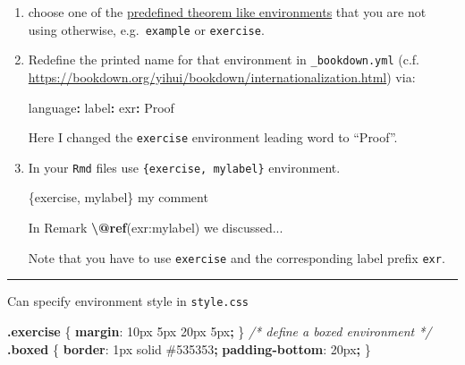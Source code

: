 \documentclass[
]{book}
\newenvironment{Shaded}{\begin{snugshade}}{\end{snugshade}}
\newcommand{\CharTok}[1]{\textcolor[rgb]{0.31,0.60,0.02}{#1}}
\newcommand{\CommentTok}[1]{\textcolor[rgb]{0.56,0.35,0.01}{\textit{#1}}}
\newcommand{\ConstantTok}[1]{\textcolor[rgb]{0.56,0.35,0.01}{#1}}
\newcommand{\DataTypeTok}[1]{\textcolor[rgb]{0.13,0.29,0.53}{#1}}
\newcommand{\DecValTok}[1]{\textcolor[rgb]{0.00,0.00,0.81}{#1}}
\newcommand{\FunctionTok}[1]{\textcolor[rgb]{0.13,0.29,0.53}{\textbf{#1}}}
\newcommand{\KeywordTok}[1]{\textcolor[rgb]{0.13,0.29,0.53}{\textbf{#1}}}
\newcommand{\NormalTok}[1]{#1}
\newcommand{\OperatorTok}[1]{\textcolor[rgb]{0.81,0.36,0.00}{\textbf{#1}}}
\newcommand{\SpecialCharTok}[1]{\textcolor[rgb]{0.81,0.36,0.00}{\textbf{#1}}}
\newcommand{\StringTok}[1]{\textcolor[rgb]{0.31,0.60,0.02}{#1}}
\theoremstyle{definition}
\theoremstyle{definition}
\theoremstyle{definition}
\theoremstyle{definition}
\theoremstyle{remark}
\begin{document}
\begin{enumerate}
\def\labelenumi{\arabic{enumi}.}
\item
  choose one of the \href{https://bookdown.org/yihui/bookdown/markdown-extensions-by-bookdown.html\#theorems}{predefined theorem like environments} that you are not using otherwise, e.g.~\texttt{example} or \texttt{exercise}.
\item
  Redefine the printed name for that environment in \texttt{\_bookdown.yml} (c.f. \url{https://bookdown.org/yihui/bookdown/internationalization.html}) via:

\begin{Shaded}
\begin{Highlighting}[]
\NormalTok{language}\SpecialCharTok{:}
\NormalTok{  label}\SpecialCharTok{:}
\NormalTok{    exr}\SpecialCharTok{:} \StringTok{\textquotesingle{}Proof \textquotesingle{}}
\end{Highlighting}
\end{Shaded}

  Here I changed the \texttt{exercise} environment leading word to ``Proof''.
\item
  In your \texttt{Rmd} files use \texttt{\{exercise,\ mylabel\}} environment.

\begin{Shaded}
\begin{Highlighting}[]
\NormalTok{\textasciigrave{}\textasciigrave{}\textasciigrave{}\{exercise, mylabel\}}
\NormalTok{my comment}
\NormalTok{\textasciigrave{}\textasciigrave{}\textasciigrave{}}

\NormalTok{In Remark }\FunctionTok{\textbackslash{}@ref}\NormalTok{(exr:mylabel) we discussed...}
\end{Highlighting}
\end{Shaded}

  Note that you have to use \texttt{exercise} and the corresponding label prefix \texttt{exr}.
\end{enumerate}

\begin{center}\rule{0.5\linewidth}{0.5pt}\end{center}

Can specify environment style in \texttt{style.css}

\begin{Shaded}
\begin{Highlighting}[]
\FunctionTok{.exercise}\NormalTok{ \{}
    \KeywordTok{margin}\CharTok{:} \DecValTok{10}\DataTypeTok{px} \DecValTok{5}\DataTypeTok{px} \DecValTok{20}\DataTypeTok{px} \DecValTok{5}\DataTypeTok{px}\OperatorTok{;} 
\NormalTok{\}}
\CommentTok{/* define a boxed environment */}
\FunctionTok{.boxed}\NormalTok{ \{}
    \KeywordTok{border}\CharTok{:} \DecValTok{1}\DataTypeTok{px} \DecValTok{solid} \ConstantTok{\#535353}\OperatorTok{;}
    \KeywordTok{padding{-}bottom}\CharTok{:} \DecValTok{20}\DataTypeTok{px}\OperatorTok{;}
\NormalTok{\}}
\end{Highlighting}
\end{Shaded}
\end{document}
